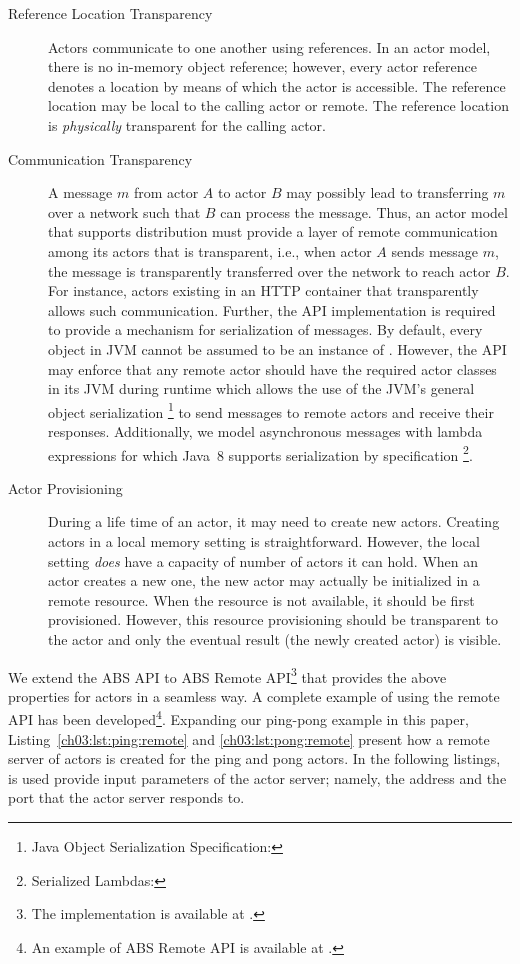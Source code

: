 \begin{description}
\item[Reference Location Transparency] 
Actors communicate to one another using references. 
In an actor model, there is no in-memory object reference; however, every actor reference denotes a location by means of which the actor is accessible.
The reference location may be local to the calling actor or remote.
The reference location is \emph{physically} transparent for the calling actor.
\item[Communication Transparency]
A message $m$ from actor $A$ to actor $B$ may possibly lead to transferring $m$ over a network such that $B$ can process the message.
Thus, an actor model that supports distribution must provide a layer of remote communication among its actors that is transparent, i.e., 
when actor $A$ sends message $m$, the message is transparently transferred over the network to reach actor $B$.
For instance, actors existing in an HTTP container that transparently allows such communication.
Further, the API implementation is required to provide a mechanism for serialization of messages.
By default, every object in JVM cannot be assumed to be an instance of .
However, the API may enforce  that any remote actor should have the required actor classes in its JVM during runtime which
allows the use of the JVM's general object serialization
\footnote{Java Object Serialization Specification: }
to send messages to remote actors and receive their responses.
Additionally, we model asynchronous messages with lambda expressions for which Java~8 supports serialization by specification
\footnote{Serialized Lambdas: }.
\item[Actor Provisioning]
During a life time of an actor, it may need to create new actors.
Creating actors in a local memory setting is straightforward. 
However, the local setting \emph{does} have a capacity of number of actors it can hold.
When an actor creates a new one, the new actor may actually be initialized in a remote resource.
When the resource is not available, it should be first provisioned.
However, this resource provisioning should be transparent to the actor and only the eventual result (the newly created actor) is visible.
\end{description}

We extend the ABS API to ABS Remote API\footnote{The implementation is available at .} 
that provides the above properties for  actors in a seamless way.
A complete example of using the remote API has been developed\footnote{An example of ABS Remote API is available at .}. 
Expanding our ping-pong example in this paper, Listing~\ref{ch03:lst:ping:remote} and \ref{ch03:lst:pong:remote} present how a remote server of actors is created for the ping and pong actors.
In the following listings,  is used provide input parameters of the actor server;
namely, the address and the port that the actor server responds to.


